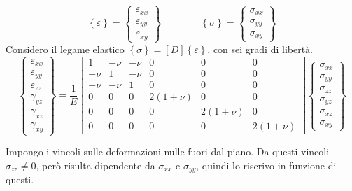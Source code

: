     \begin{equation*}
     \left\{\varepsilon\right\} = \left\{
    \begin{array}{c}
    \varepsilon_{xx} \\ \varepsilon_{yy} \\ \varepsilon_{xy}
    \end{array}
    \right\}
    \quad\quad\quad\quad
     \left\{\sigma\right\} = \left\{
    \begin{array}{c}
    \sigma_{xx} \\ \sigma_{yy} \\ \sigma_{xy}
    \end{array}
    \right\}
 \end{equation*}
Considero il legame elastico $ \left\{\sigma\right\}=[D] \left\{\varepsilon\right\}$, con sei gradi di libertà.
\begin{equation*}
\left\{
\begin{array}{c}
\varepsilon_{xx} \\
\varepsilon_{yy} \\
\varepsilon_{zz} \\
\gamma_{yz} \\
\gamma_{xz} \\
\gamma_{xy}
\end{array}
\right\}
=
\frac{1}{E}
\begin{bmatrix}
1 & -\nu & -\nu & 0 & 0 & 0 \\
-\nu & 1 & -\nu & 0 & 0 & 0 \\
-\nu & -\nu & 1 & 0 & 0 & 0 \\
0 & 0 & 0 & 2(1+\nu) & 0 & 0 \\
0 & 0 & 0 & 0 & 2(1+\nu) & 0 \\
0 & 0 & 0 & 0 & 0 & 2(1+\nu)
\end{bmatrix}
\left\{
\begin{array}{c}
\sigma_{xx} \\
\sigma_{yy} \\
\sigma_{zz} \\
\sigma_{yz} \\
\sigma_{xz} \\
\sigma_{xy}
\end{array}
\right\}
\end{equation*}

Impongo i vincoli sulle deformazioni nulle fuori dal piano. Da questi vincoli $\sigma_{zz}\neq0$, però risulta dipendente da $\sigma_{xx}$ e $\sigma_{yy}$, quindi lo riscrivo in funzione di questi.

